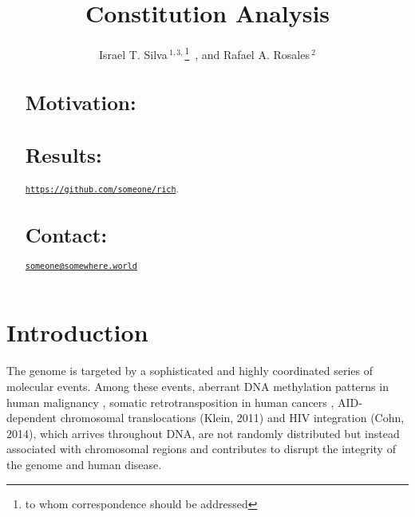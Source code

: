 \documentclass{bioinfo}
\begin{document}
\title[AID hotspots]{Constitution Analysis} 
 \author[I. T. Silva~\textit{et~al}]{%
     Israel T. Silva\,$^{1,3,}$\footnote{to
  whom correspondence should be addressed}\ , 
  and
       Rafael A. Rosales\,$^2$
  }

 \address{$^{1}$Laboratory of Molecular Immunology, The Rockefeller 
     University, 1230 York Avenue, New York, NY 10065\\
     $^{2}$Departamento de Computa\c{c}\~ao e Matem\'atica,
     Universidade de S\~ao Paulo. Av. Bandeirantes, 3900,
     Ribeir\~ao Preto,  CEP 14049-901, SP, Brazil%
}


\maketitle
\begin{abstract}
  \section{Motivation:}
  \section{Results:} 
  \href{https://github.com/someone/rich}{\texttt{https://github.com/someone/rich}}.
  \section{Contact:}
  \href{mailto:someone@somewhere.world}{\tt someone@somewhere.world}%
\end{abstract}

\section{Introduction}
The genome is targeted by a sophisticated and highly coordinated series of molecular events.  Among these events, aberrant DNA methylation patterns in human malignancy \cite{pmid23326238}, somatic retrotransposition in human cancers \cite{pmid22745252}, AID-dependent chromosomal translocations (Klein, 2011) and HIV integration (Cohn, 2014), which arrives throughout DNA, are not randomly distributed but instead associated with chromosomal regions and contributes to disrupt the integrity of the genome and human disease.
\end{document}
